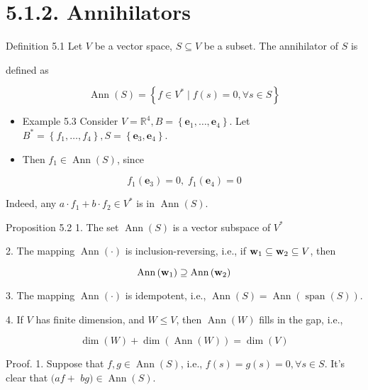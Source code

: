 \documentclass[11pt]{article}
\begin{document}
\section*{5.1.2. Annihilators}

Definition 5.1 Let \(V\) be a vector space, \(S \subseteq  V\) be a subset. The annihilator of \(S\) is

defined as

\[
\operatorname{Ann}\left( S\right)  = \left\{  {f \in  {V}^{ * } \mid  f\left( s\right)  = 0,\forall s \in  S}\right\}
\]

\begin{itemize}
\item Example 5.3 Consider \(V = {\mathbb{R}}^{4},B = \left\{  {{\mathbf{e}}_1,\ldots ,{\mathbf{e}}_{4}}\right\}\). Let \({B}^{ * } = \left\{  {{f}_1,\ldots ,{f}_{4}}\right\}  ,S = \left\{  {{\mathbf{e}}_{3},{\mathbf{e}}_{4}}\right\}\).
\end{itemize}

\begin{itemize}
\item Then \({f}_1 \in  \operatorname{Ann}\left( S\right)\), since
\end{itemize}

\[
{f}_1\left( {\mathbf{e}}_{3}\right)  = 0,\;{f}_1\left( {\mathbf{e}}_{4}\right)  = 0
\]

Indeed, any \(a \cdot  {f}_1 + b \cdot  {f}_2 \in  {V}^{ * }\) is in \(\operatorname{Ann}\left( S\right)\).

Proposition 5.2 1. The set \(\operatorname{Ann}\left( S\right)\) is a vector subspace of \({V}^{ * }\)

2. The mapping \(\operatorname{Ann}\left( \cdot \right)\) is inclusion-reversing, i.e., if \({\bf w}_1 \subseteq  {\bf w}_2 \subseteq  V\), then

\[
\operatorname{Ann}\left( {\bf w}_1\right)  \supseteq  \operatorname{Ann}\left( {\bf w}_2\right)
\]

3. The mapping \(\operatorname{Ann}\left( \cdot \right)\) is idempotent, i.e., \(\operatorname{Ann}\left( S\right)  = \operatorname{Ann}\left( {\operatorname{span}\left( S\right) }\right)\).

4. If \(V\) has finite dimension, and \(W \leq  V\), then \(\operatorname{Ann}\left( W\right)\) fills in the gap, i.e.,

\[
\dim \left( W\right)  + \dim \left( {\operatorname{Ann}\left( W\right) }\right)  = \dim \left( V\right)
\]

Proof. 1. Suppose that \(f,g \in  \operatorname{Ann}\left( S\right)\), i.e., \(f\left( s\right)  = g\left( s\right)  = 0,\forall s \in  S\). It’s clear that \(({af} +\)  \({bg}) \in  \operatorname{Ann}\left( S\right)\).
\end{document}
